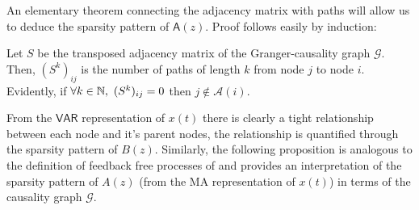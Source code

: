 \documentclass[12pt]{article}
\def\gcg{\mathcal{G}}  %
\def\VAR{\mathsf{VAR}}  %
\def\B{\mathsf{B}}  %
\def\wtB{\widetilde{\B}}  %
\def\A{\mathsf{A}}  %
\newcommand{\pa}[1]{pa(#1)}  %
\newcommand{\anc}[1]{\mathcal{A}(#1)}  %
\begin{document}
An elementary theorem connecting the adjacency matrix with paths will
allow us to deduce the sparsity pattern of $\A(z)$.  Proof follows
easily by induction:

\begin{lemma}
  \label{lem:adj_matrix}
  Let $S$ be the transposed adjacency matrix of the Granger-causality
  graph $\gcg$.  Then, $(S^k)_{ij}$ is the number of paths of length
  $k$ from node $j$ to node $i$.  Evidently, if
  $\forall k \in \mathbb{N},\ (S^k)_{ij} = 0$ then $j \not\in \anc{i}$.
\end{lemma}


From the $\VAR$ representation of $x(t)$ there is clearly a tight
relationship between each node and it's parent nodes, the relationship
is quantified through the sparsity pattern of $B(z)$.  Similarly, the
following proposition is analogous to the definition of feedback free
processes of \cite{caines1975feedback} and provides an interpretation
of the sparsity pattern of $A(z)$ (from the MA representation of
$x(t)$) in terms of the causality graph $\gcg$.



\end{document}
